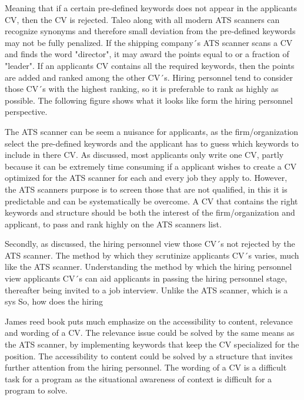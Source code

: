 Meaning that if a certain pre-defined keywords does not appear in the applicants CV, then the CV is rejected.
Taleo along with all modern ATS scanners can recognize synonyms and therefore small deviation from the pre-defined keywords may not be fully penalized.
If the shipping company´s ATS scanner scans a CV and finds the word "director", it may award the points equal to or a fraction of "leader".
If an applicants CV contains all the required keywords, then the points are added and ranked among the other CV´s.
Hiring personnel tend to consider those CV´s with the highest ranking, so it is preferable to rank as highly as possible.
The following figure shows what it looks like form the hiring personnel perspective.


The ATS scanner can be seem a nuisance for applicants, as the firm/organization select the pre-defined keywords and the applicant has to guess which keywords to include in there CV.
As discussed, most applicants only write one CV, partly because it can be extremely time consuming if a applicant wishes to create a CV optimized for the ATS scanner for each and every job they apply to.
However, the ATS scanners purpose is to screen those that are not qualified, in this it is predictable and can be systematically be overcome.
A CV that contains the right keywords and structure should be both the interest of the firm/organization and applicant, to pass and rank highly on the ATS scanners list.

Secondly, as discussed, the hiring personnel view those CV´s not rejected by the ATS scanner.
The method by which they scrutinize applicants CV´s varies, much like the ATS scanner.
Understanding the method by which the hiring personnel view applicants CV´s can aid applicants in passing the hiring personnel stage, thereafter being invited to a job interview.
Unlike the ATS scanner, which is a sys
So, how does the hiring

James reed book puts much emphasize on the accessibility to content, relevance and wording of a CV. \cite{7_second_test}
The relevance issue could be solved by the same means as the ATS scanner, by implementing keywords that keep the CV specialized for the position.
The accessibility to content could be solved by a structure that invites further attention from the hiring personnel.
The wording of a CV is a difficult task for a program as the situational awareness of context is difficult for a program to solve.
\cite{7_second_test} 
\cite{7_Seconds_to_Get_a_Recruiter_Attention}
\cite{ATS-scanner} \\


